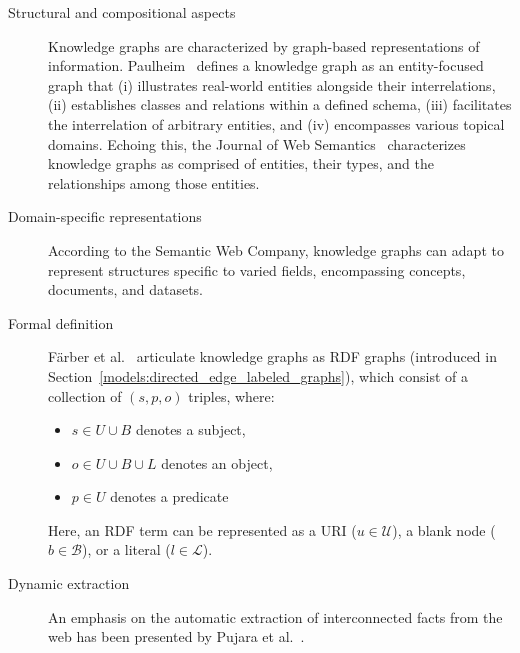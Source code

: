 \begin{description}
    \item[Structural and compositional aspects] Knowledge graphs are characterized by graph-based representations of information. Paulheim~\cite{Paulheim2016KnowledgeGR} defines a knowledge graph as an entity-focused graph that (i) illustrates real-world entities alongside their interrelations, (ii) establishes classes and relations within a defined schema, (iii) facilitates the interrelation of arbitrary entities, and (iv) encompasses various topical domains. Echoing this, the Journal of Web Semantics~\cite{Kroetsch2016knowledge} characterizes knowledge graphs as comprised of entities, their types, and the relationships among those entities.
    
    \item[Domain-specific representations] According to the Semantic Web Company, knowledge graphs can adapt to represent structures specific to varied fields, encompassing concepts, documents, and datasets.    
    
        \item[Formal definition] Färber et al.~\cite{Farber2016linked} articulate knowledge graphs as RDF graphs (introduced in Section~\ref{models:directed_edge_labeled_graphs}), which consist of a collection of $(s, p, o)$ triples, where:
    \begin{itemize}
        \item $s\in U \cup B$ denotes a subject,
        \item $o\in U\cup B\cup L$ denotes an object,
        \item $p\in U$ denotes a predicate
    \end{itemize}
    Here, an RDF term can be represented as a URI ($u\in \mathcal{U}$), a blank node ($b\in \mathcal{B}$), or a literal ($l\in \mathcal{L}$).
    
    \item[Dynamic extraction] An emphasis on the automatic extraction of interconnected facts from the web has been presented by Pujara et al.~\cite{Pujara2013KGIdentification}.
\end{description}

